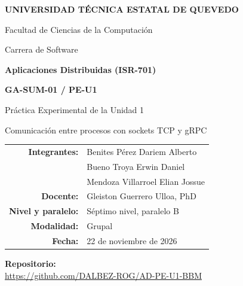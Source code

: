 \documentclass[12pt,a4paper]{article}
\newcommand{\repourl}{https://github.com/DALBEZ-ROG/AD-PE-U1-BBM}
\newcommand{\fecha}{22 de noviembre de 2026}
\begin{document}
\begin{center}
  {\Large\bfseries UNIVERSIDAD TÉCNICA ESTATAL DE QUEVEDO\par}
  \vspace{4pt}
  {\large Facultad de Ciencias de la Computación\par}
  {\large Carrera de Software\par}
  \vspace{1.6cm}
  {\large\bfseries Aplicaciones Distribuidas (ISR-701)\par}
  \vspace{0.8cm}
  {\Large\bfseries GA-SUM-01 / PE-U1\par}
  \vspace{4pt}
  {\large Práctica Experimental de la Unidad 1\par}
  \vspace{4pt}
  {Comunicación entre procesos con sockets TCP y gRPC\par}
\end{center}

\vspace{1.4cm}
\begin{center}
\renewcommand{\arraystretch}{1.5}
\begin{tabular}{>{\bfseries}r l}
  Integrantes: & Benites Pérez Dariem Alberto \\
               & Bueno Troya Erwin Daniel \\
               & Mendoza Villarroel Elian Jossue \\
  Docente:     & Gleiston Guerrero Ulloa, PhD \\
  Nivel y paralelo: & Séptimo nivel, paralelo B \\
  Modalidad:   & Grupal \\
  Fecha:       & \fecha \\
\end{tabular}
\end{center}

\vfill
\begin{center}
  {\bfseries Repositorio:}\\[4pt]
  {\small\url{\repourl}}
\end{center}
\vspace{1cm}
\end{document}
